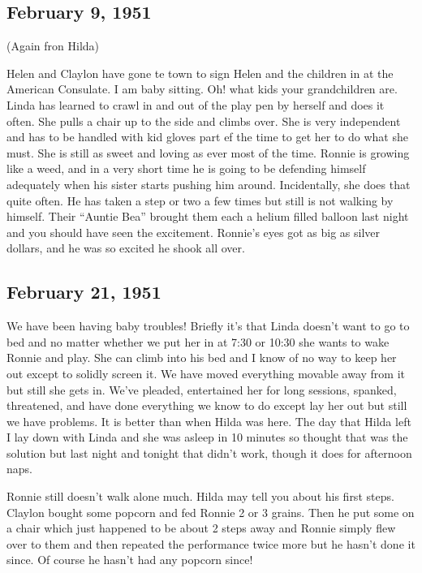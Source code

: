 \documentclass[
]{book}
\begin{document}
\hypertarget{february-9-1951}{%
\subsection{February 9, 1951}\label{february-9-1951}}

(Again fron Hilda)

Helen and Claylon have gone te town to sign Helen and the children in at the American Consulate. I am baby sitting. Oh! what kids your grandchildren are. Linda has learned to crawl in and out of the play pen by herself and does it often. She pulls a chair up to the side and climbs over. She is very independent and has to be handled with kid gloves part ef the time to get her to do what she must. She is still as sweet and loving as ever most of the time. Ronnie is growing like a weed, and in a very short time he is going to be defending himself adequately when his sister starts pushing him around. Incidentally, she does that quite often. He has taken a step or two a few times but still is not walking by himself. Their ``Auntie Bea'' brought them each a helium filled balloon last night and you should have seen the excitement. Ronnie's eyes got as big as silver dollars, and he was so excited he shook all over.

\hypertarget{february-21-1951}{%
\subsection{February 21, 1951}\label{february-21-1951}}

We have been having baby troubles! Briefly it's that Linda doesn't want to go to bed and no matter whether we put her in at 7:30 or 10:30 she wants to wake Ronnie and play. She can climb into his bed and I know of no way to keep her out except to solidly screen it. We have moved everything movable away from it but still she gets in. We've pleaded, entertained her for long sessions, spanked, threatened, and have done everything we know to do except lay her out but still we have problems. It is better than when Hilda was here. The day that Hilda left I lay down with Linda and she was asleep in 10 minutes so thought that was the solution but last night and tonight that didn't work, though it does for afternoon naps.

Ronnie still doesn't walk alone much. Hilda may tell you about his first steps. Claylon bought some popcorn and fed Ronnie 2 or 3 grains. Then he put some on a chair which just happened to be about 2 steps away and Ronnie simply flew over to them and then repeated the performance twice more but he hasn't done it since. Of course he hasn't had any popcorn since!
\end{document}
